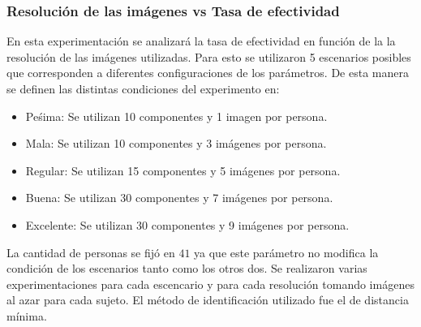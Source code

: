 \subsubsection{Resolución de las imágenes vs Tasa de efectividad}
En esta experimentación se analizará la tasa de efectividad en función de la la resolución de las imágenes utilizadas. Para esto se utilizaron 5 escenarios posibles que corresponden a diferentes configuraciones de los parámetros. De esta manera se definen las distintas condiciones del experimento en:
\begin{itemize}
\item Peśima: Se utilizan 10 componentes y 1 imagen por persona.
\item Mala: Se utilizan 10 componentes y 3 imágenes por persona.
\item Regular: Se utilizan 15 componentes y 5 imágenes por persona.
\item Buena: Se utilizan 30 componentes y 7 imágenes por persona.
\item Excelente: Se utilizan 30 componentes y 9 imágenes por persona.
\end{itemize}
La cantidad de personas se fijó en $41$ ya que este parámetro no modifica la condición de los escenarios tanto como los otros dos. Se realizaron varias experimentaciones para cada escencario y para cada resolución tomando imágenes al azar para cada sujeto. El método de identificación utilizado fue el de distancia mínima.
